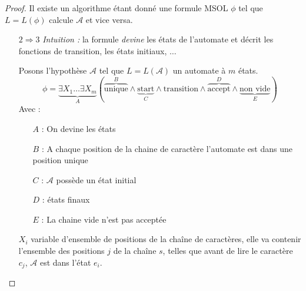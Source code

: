 \documentclass[a4paper, 11pt]{thesis}
\begin{document}
\begin{proof}
    Il existe un algorithme étant donné une formule MSOL $\phi$ tel que $L = L(\phi)$ calcule
    $\mathcal{A}$ et vice versa.
    \begin{itemize}
        \item[$2 \Rightarrow 3$] \emph{Intuition :} la formule \emph{devine} les états de l'automate
            et décrit les fonctions de transition, les états initiaux, $\dots$

            Posons l'hypothèse $\mathcal{A}$ tel que $L = L(\mathcal{A})$ un automate à $m$ états.
            \[
                \phi = \underbrace{\exists X_1 \dots \exists X_m}_A
                \left ( \overbrace{\mbox{unique}}^B \wedge
                \underbrace{\mbox{start}}_C \wedge
                \mbox{transition} \wedge \overbrace{\mbox{accept}}^D \wedge
                \underbrace{\mbox{non vide}}_E \right )
            \]
            Avec : \begin{itemize}
                \item[$A$ :] On devine les états
                \item[$B$ :] A chaque position de la chaine de caractère l'automate est dans une position unique
                \item[$C$ :] $\mathcal{A}$ possède un état initial
                \item[$D$ :] états finaux
                \item[$E$ :] La chaine vide n'est pas acceptée
            \end{itemize}

            $X_i$ variable d'ensemble de positions de la chaîne de caractères, elle va contenir
            l'ensemble des positions $j$ de la chaîne $s$, telles que avant de lire le caractère
            $c_j$, $\mathcal{A}$ est dans l'état $e_i$. \\


\end{itemize}
\end{proof}
\end{document}
